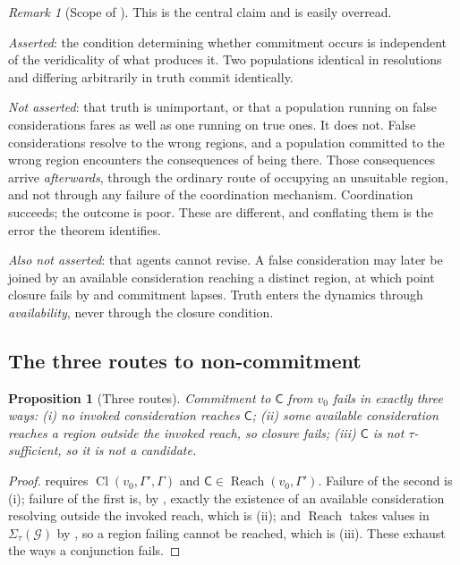 \documentclass[11pt,a4paper]{article}
\theoremstyle{clstyle}
\newtheorem{proposition}[theorem]{Proposition}
\theoremstyle{definition}
\theoremstyle{remark}
\newtheorem{remark}[theorem]{Remark}
\DeclareMathOperator{\Reach}{Reach}
\DeclareMathOperator{\Cl}{Cl}
\newcommand{\Gph}{\mathcal{G}}
\newcommand{\Cell}{\mathsf{C}}
\newcommand{\Sig}{\Sigma}
\begin{document}
\begin{remark}[Scope of ]
\label{rem:truth-scope}
This is the central claim and is easily overread.

\emph{Asserted}: the condition determining whether commitment occurs is
independent of the veridicality of what produces it. Two populations
identical in resolutions and differing arbitrarily in truth commit
identically.

\emph{Not asserted}: that truth is unimportant, or that a population running
on false considerations fares as well as one running on true ones. It does
not. False considerations resolve to the wrong regions, and a population
committed to the wrong region encounters the consequences of being there.
Those consequences arrive \emph{afterwards}, through the ordinary route of
occupying an unsuitable region, and not through any failure of the
coordination mechanism. Coordination succeeds; the outcome is poor. These
are different, and conflating them is the error the theorem identifies.

\emph{Also not asserted}: that agents cannot revise. A false consideration
may later be joined by an available consideration reaching a distinct
region, at which point closure fails by  and
commitment lapses. Truth enters the dynamics through \emph{availability},
never through the closure condition.
\end{remark}

\subsection{The three routes to non-commitment}
\label{sec:instrument-behaviour}

\begin{proposition}[Three routes]
\label{prop:three-routes}
Commitment to $\Cell$ from $v_0$ fails in exactly three ways: \textup{(i)} no
invoked consideration reaches $\Cell$; \textup{(ii)} some available
consideration reaches a region outside the invoked reach, so closure fails;
\textup{(iii)} $\Cell$ is not $\tau$-sufficient, so it is not a candidate.
\end{proposition}

\begin{proof}
 requires $\Cl(v_0,\Gamma',\Gamma)$ and
$\Cell\in\Reach(v_0,\Gamma')$. Failure of the second is (i); failure of the
first is, by , exactly the existence of an available
consideration resolving outside the invoked reach, which is (ii); and
$\Reach$ takes values in $\Sig_\tau(\Gph)$ by , so a
region failing  cannot be reached, which is (iii).
These exhaust the ways a conjunction fails.
\end{proof}
\end{document}
